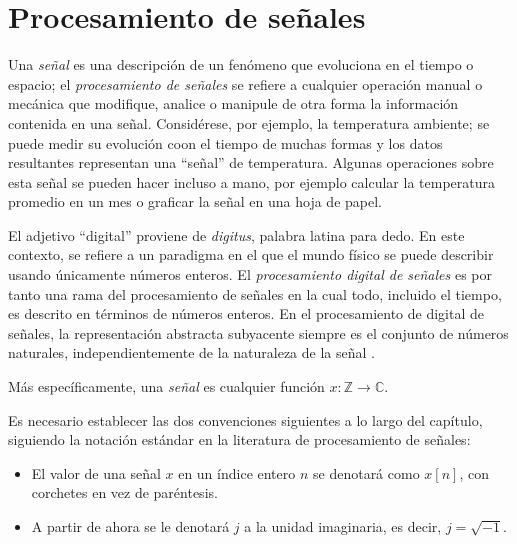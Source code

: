 \newpage
\section{Procesamiento de señales}

Una \emph{señal} es una descripción de un fenómeno que evoluciona en el tiempo o espacio; el \emph{procesamiento de señales} se refiere a cualquier operación manual o mecánica que modifique, analice o manipule de otra forma la información contenida en una señal. Considérese, por ejemplo, la temperatura ambiente; se puede medir su evolución coon el tiempo de muchas formas y los datos resultantes representan una ``señal'' de temperatura. Algunas operaciones sobre esta señal se pueden hacer incluso a mano, por ejemplo calcular la temperatura promedio en un mes o graficar la señal en una hoja de papel.

\bigskip

El adjetivo ``digital'' proviene de \emph{digitus}, palabra latina para dedo. En este contexto, se refiere a un paradigma en el que el mundo físico se puede describir usando únicamente números enteros.
El \emph{procesamiento digital de señales} es por tanto una rama del procesamiento de señales en la cual todo, incluido el tiempo, es descrito en términos de números enteros. En el procesamiento de digital de señales, la representación abstracta subyacente siempre es el conjunto de números naturales, independientemente de la naturaleza de la señal \cite{Prand1}.

\begin{definition}
Más específicamente, una \emph{señal} es cualquier función $x : \mathbb{Z} \longrightarrow \mathbb{C}$.
\end{definition}

\begin{remark}
Es necesario establecer las dos convenciones siguientes a lo largo del capítulo, siguiendo la notación estándar en la literatura de procesamiento de señales:
\begin{itemize}
\item El valor de una señal $x$ en un índice entero $n$ se denotará como $x[n]$, con corchetes en vez de paréntesis.
\item A partir de ahora se le denotará $j$ a la unidad imaginaria, es decir, $j = \sqrt{-1}$.
\end{itemize}
\end{remark}

